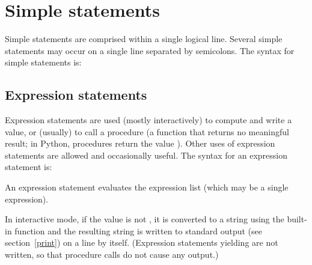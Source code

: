 \chapter{Simple statements \label{simple}}

Simple statements are comprised within a single logical line.
Several simple statements may occur on a single line separated
by semicolons.  The syntax for simple statements is:

\begin{productionlist}
\end{productionlist}


\section{Expression statements \label{exprstmts}}

Expression statements are used (mostly interactively) to compute and
write a value, or (usually) to call a procedure (a function that
returns no meaningful result; in Python, procedures return the value
).  Other uses of expression statements are allowed and
occasionally useful.  The syntax for an expression statement is:

\begin{productionlist}
             {}
\end{productionlist}

An expression statement evaluates the expression list (which may be a
single expression).

In interactive mode, if the value is not , it is converted
to a string using the built-in 
function and the resulting string is written to standard output (see
section~\ref{print}) on a line by itself.  (Expression statements
yielding  are not written, so that procedure calls do not
cause any output.)


